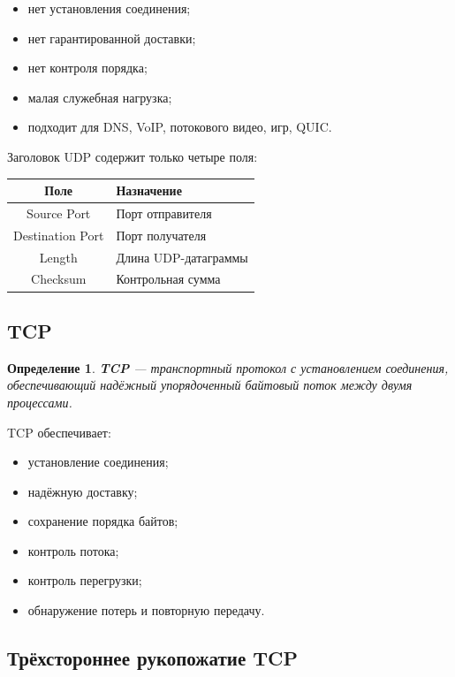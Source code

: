 \documentclass[12pt,a4paper]{article}
\newtheorem{definition}{Определение}
\begin{document}
\begin{itemize}
    \item нет установления соединения;
    \item нет гарантированной доставки;
    \item нет контроля порядка;
    \item малая служебная нагрузка;
    \item подходит для DNS, VoIP, потокового видео, игр, QUIC.
\end{itemize}

Заголовок UDP содержит только четыре поля:

\begin{center}
\begin{tabular}{|c|p{8cm}|}
\hline
\textbf{Поле} & \textbf{Назначение} \\
\hline
Source Port & Порт отправителя \\
\hline
Destination Port & Порт получателя \\
\hline
Length & Длина UDP-датаграммы \\
\hline
Checksum & Контрольная сумма \\
\hline
\end{tabular}
\end{center}

\subsection{TCP}

\begin{definition}
\textbf{TCP} --- транспортный протокол с установлением соединения, обеспечивающий надёжный упорядоченный байтовый поток между двумя процессами.
\end{definition}

TCP обеспечивает:

\begin{itemize}
    \item установление соединения;
    \item надёжную доставку;
    \item сохранение порядка байтов;
    \item контроль потока;
    \item контроль перегрузки;
    \item обнаружение потерь и повторную передачу.
\end{itemize}

\subsection{Трёхстороннее рукопожатие TCP}
\end{document}

